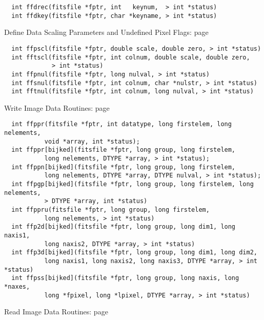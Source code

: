 \begin{verbatim}
  int ffdrec(fitsfile *fptr, int   keynum,  > int *status)
  int ffdkey(fitsfile *fptr, char *keyname, > int *status)
\end{verbatim}
 Define Data Scaling Parameters and Undefined Pixel Flags: page~\pageref{FFPSCL}

\begin{verbatim}
  int ffpscl(fitsfile *fptr, double scale, double zero, > int *status)
  int fftscl(fitsfile *fptr, int colnum, double scale, double zero,
             > int *status)
  int ffpnul(fitsfile *fptr, long nulval, > int *status)
  int ffsnul(fitsfile *fptr, int colnum, char *nulstr, > int *status)
  int fftnul(fitsfile *fptr, int colnum, long nulval, > int *status)
\end{verbatim}
 Write Image Data Routines: page~\pageref{FFPPR}

\begin{verbatim}
  int ffppr(fitsfile *fptr, int datatype, long firstelem, long nelements,
           void *array, int *status);
  int ffppr[bijked](fitsfile *fptr, long group, long firstelem,
           long nelements, DTYPE *array, > int *status);
  int ffppn[bijked](fitsfile *fptr, long group, long firstelem,
           long nelements, DTYPE *array, DTYPE nulval, > int *status);
  int ffpgp[bijked](fitsfile *fptr, long group, long firstelem, long nelements,
           > DTYPE *array, int *status)
  int ffppru(fitsfile *fptr, long group, long firstelem,
           long nelements, > int *status)
  int ffp2d[bijked](fitsfile *fptr, long group, long dim1, long naxis1,
           long naxis2, DTYPE *array, > int *status)
  int ffp3d[bijked](fitsfile *fptr, long group, long dim1, long dim2,
           long naxis1, long naxis2, long naxis3, DTYPE *array, > int *status)
  int ffpss[bijked](fitsfile *fptr, long group, long naxis, long *naxes,
           long *fpixel, long *lpixel, DTYPE *array, > int *status)
\end{verbatim}
 Read Image Data Routines: page~\pageref{FFGPV}

